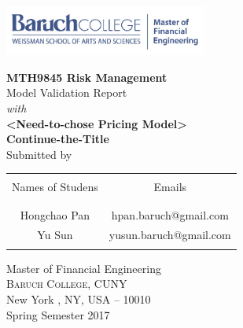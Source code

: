 \begin{titlepage}

\includegraphics[width=0.5\textwidth]{./MFE-Logo}\\[0.2in]

\begin{center}

\textup{\Large {\bf MTH9845 Risk Management} \\ [0.2in] Model Validation Report}\\[0.2in] \textit{with}\\[0.2in]

\Large \textbf {{<Need-to-chose Pricing Model>}\\ Continue-the-Title} \\ [1in]



\normalsize Submitted by \\
\begin{table}[h]
\centering
\begin{tabular}{cc}\hline \\
Names of Studens & Emails \\ \\ \hline
\\
Hongchao Pan & hpan.baruch@gmail.com \\[0.1in]
Yu Sun & yusun.baruch@gmail.com \\ \\ \hline 
\end{tabular}
\end{table}

\vspace{.1in}

\vfill

\Large{Master of Financial Engineering}\\
\normalsize
\textsc{Baruch College, CUNY}\\
New York , NY, USA -- 10010 \\
\vspace{0.2cm}
Spring Semester 2017

\end{center}

\end{titlepage}

